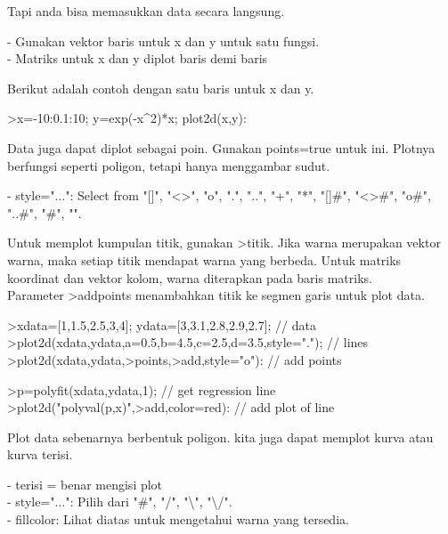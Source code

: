 \documentclass{article}
\begin{document}
\begin{eulernotebook}
\begin{eulercomment}
\begin{eulercomment}
\begin{eulercomment}
\begin{eulercomment}
\begin{eulercomment}
\begin{eulercomment}
\begin{eulercomment}
Tapi anda bisa memasukkan data secara langsung.

- Gunakan vektor baris untuk x dan y untuk satu fungsi.\\
- Matriks untuk x dan y diplot baris demi baris

Berikut adalah contoh dengan satu baris untuk x dan y.

\end{eulercomment}
\begin{eulerprompt}
>x=-10:0.1:10; y=exp(-x^2)*x; plot2d(x,y):
\end{eulerprompt}
\begin{eulercomment}
Data  juga  dapat  diplot  sebagai  poin.  Gunakan  points=true  untuk
ini.  Plotnya  berfungsi  seperti  poligon,  tetapi  hanya  menggambar
sudut.

- style="...": Select from "[]", "\textless{}\textgreater{}", "o", ".", "..", "+", "*",
"[]#", "\textless{}\textgreater{}#", "o#", "..#", "#", "\textbar{}".

Untuk  memplot  kumpulan  titik,  gunakan  \textgreater{}titik.  Jika  warna
merupakan  vektor  warna,  maka  setiap  titik  mendapat  warna  yang
berbeda.  Untuk  matriks  koordinat  dan  vektor  kolom, warna
diterapkan  pada  baris  matriks.\\
Parameter  \textgreater{}addpoints  menambahkan  titik  ke  segmen  garis  untuk
plot  data.
\end{eulercomment}
\begin{eulerprompt}
>xdata=[1,1.5,2.5,3,4]; ydata=[3,3.1,2.8,2.9,2.7]; // data
>plot2d(xdata,ydata,a=0.5,b=4.5,c=2.5,d=3.5,style="."); // lines
>plot2d(xdata,ydata,>points,>add,style="o"): // add points
\end{eulerprompt}
\begin{eulerprompt}
>p=polyfit(xdata,ydata,1); // get regression line
>plot2d("polyval(p,x)",>add,color=red): // add plot of line
\end{eulerprompt}
\begin{eulercomment}
Plot data sebenarnya berbentuk poligon. kita juga dapat memplot kurva
atau kurva terisi.

- terisi = benar mengisi plot\\
- style="...": Pilih dari "#", "/", "\textbackslash{}", "\textbackslash{}/".\\
- fillcolor: Lihat diatas untuk mengetahui warna yang tersedia.


\end{eulercomment}
\end{eulercomment}
\end{eulercomment}
\end{eulercomment}
\end{eulercomment}
\end{eulercomment}
\end{eulercomment}
\end{eulernotebook}
\end{document}
